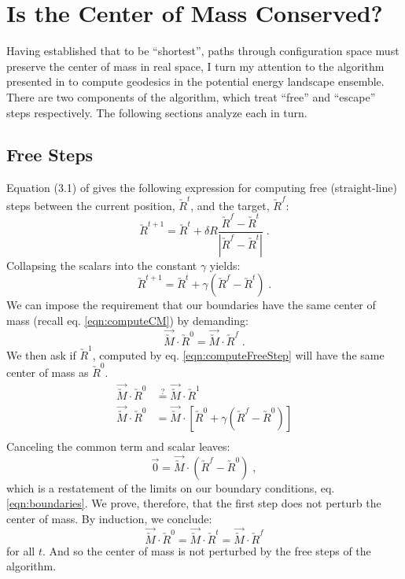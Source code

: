 \documentclass[letterpaper,12pt]{article}
\newcommand{\scmat}[1]{\vec{\utilde{#1}}}
\newcommand{\cvec}[1]{\utilde{#1}}
\newcommand{\svec}[1]{\vec{#1}}
\newcommand{\refeq}[1]{eq. \ref{eqn:#1}}
\newcommand{\laeq}[1]{\label{eqn:#1}}
\begin{document}
\section{Is the Center of Mass Conserved?}
Having established that to be ``shortest'', paths through configuration space must preserve the center of mass in real space, I turn my attention to the algorithm presented in \cite{wang:2007:geodesics} to compute geodesics in the potential energy landscape ensemble. There are two components of the algorithm,  which treat ``free'' and ``escape'' steps respectively. The following sections analyze each in turn.

\subsection{Free Steps}
Equation (3.1) of \cite{wang:2007:geodesics} gives the following expression for computing free (straight-line) steps between the current position, $\cvec{R}^{t}$, and the target, $\cvec{R}^{f}$:
\begin{equation}
\cvec{R}^{t+1} = \cvec{R}^{t} + \delta R \frac{\cvec{R}^{f} - \cvec{R}^{t}}{\left|\cvec{R}^{f} - \cvec{R}^{t} \right|} \; .
\end{equation}
Collapsing the scalars into the constant $\gamma$ yields:
\begin{equation} \laeq{computeFreeStep}
\cvec{R}^{t+1} = \cvec{R}^{t} + \gamma \left(\cvec{R}^{f} - \cvec{R}^{t}\right) \; .
\end{equation}
We can impose the requirement that our boundaries have the same center of mass (recall \refeq{computeCM}) by demanding:
\begin{equation} \laeq{boundaries}
\scmat{M} \cdot \cvec{R}^{0} =\scmat{M} \cdot \cvec{R}^{f} \; .
\end{equation}
We then ask if $\cvec{R}^{1}$, computed by \refeq{computeFreeStep} will have the same center of mass as  $\cvec{R}^{0}$.
\begin{equation}
\begin{aligned}
\scmat{M} \cdot \cvec{R}^{0} &\stackrel{?}{=} \scmat{M} \cdot \cvec{R}^{1}\\
\scmat{M} \cdot \cvec{R}^{0} &= \scmat{M} \cdot \left[ \cvec{R}^{0} + \gamma \left(\cvec{R}^{f} - \cvec{R}^{0}\right) \right]\\
\end{aligned}
\end{equation}
Canceling the common term and scalar leaves:
\begin{equation}
\svec{0} = \scmat{M} \cdot \left(\cvec{R}^{f} - \cvec{R}^{0}\right) \; ,
\end{equation}
which is a restatement of the limits on our boundary conditions, \refeq{boundaries}. We prove, therefore, that the first step does not perturb the center of mass. By induction, we conclude:
\begin{equation}
\scmat{M} \cdot \cvec{R}^{0} = \scmat{M} \cdot \cvec{R}^{t} = \scmat{M} \cdot \cvec{R}^{f}
\end{equation}
for all $t$. And so the center of mass is not perturbed by the free steps of the algorithm.
\end{document}
